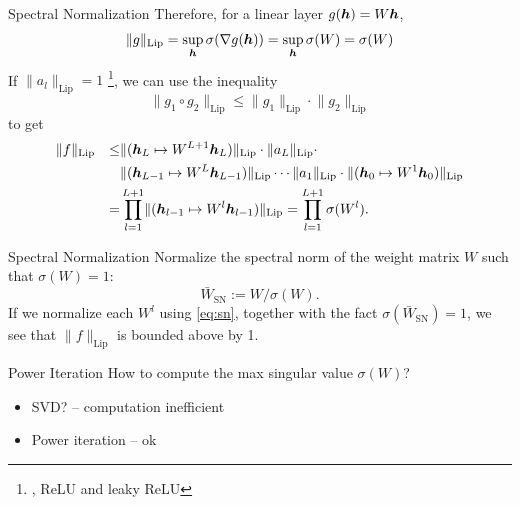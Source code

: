 \documentclass[xcolor={svgnames}]{beamer}
\newcommand{\lipnorm}[1]{\lVert #1 \rVert_\mathrm{Lip}}
\begin{document}
\begin{frame}{Spectral Normalization}
  Therefore, for a linear layer $g(\boldsymbol{h}) = W\boldsymbol{h}$,
  \[
    \lVert g \rVert_{\mathrm{Lip}} = \sup_{\boldsymbol{h}} \sigma(\nabla g(\boldsymbol{h}))
    = \sup_{\boldsymbol{h}} \sigma(W) = \sigma(W)
  \]
  If $ \lVert a_l \rVert_{\mathrm{Lip}} = 1$
  \footnote{\eg, ReLU and leaky ReLU}, we can use the inequality
  \[
    \lVert g_1 \circ g_2 \rVert_{\mathrm{Lip}} \le 
    \lVert g_1 \rVert_{\mathrm{Lip}} \cdot
    \lVert g_2 \rVert_{\mathrm{Lip}}
  \]
  to get 
  \[
    \begin{aligned}
      &\lipnorm{f} &\le &\lipnorm{(\bd{h}_L \mapsto W^{L+1}\bd{h}_L)} \cdot
      \lipnorm{a_L} \cdot \\ 
      & ~ & ~ &\lipnorm{(\bd{h}_{L-1} \mapsto W^{L}\bd{h}_{L-1})} \cdots
      \lipnorm{a_1} \cdot
      \lipnorm{(\bd{h}_0 \mapsto W^{1}\bd{h}_0)} \\
      & ~ &= &\prod_{l=1}^{L+1} \lipnorm{(\bd{h}_{l-1} 
      \mapsto W^{l}\bd{h}_{l-1})} 
      = \prod_{l=1}^{L+1}\sigma(W^l).
    \end{aligned}
  \]
\end{frame}
\begin{frame}{Spectral Normalization}
  Normalize the spectral norm of the weight matrix $W$ such that 
  $\sigma(W) = 1$:
  \begin{equation}
    \label{eq:sn}
    \bar{W}_{\mathrm{SN}} := W/\sigma(W).
  \end{equation}
  If we normalize each $W^l$ using \eqref{eq:sn}, together with the fact 
  $\sigma(\bar{W}_{\mathrm{SN}}) = 1$, we see that 
  \alert{$\lipnorm{f}$ is bounded above by 1}.
\end{frame}
\begin{frame}{Power Iteration}
  How to compute the max singular value $\sigma(W)$?
\begin{itemize}
  \item SVD? -- computation inefficient
  \item Power iteration -- ok
\end{itemize}
\end{frame}
\end{document}
